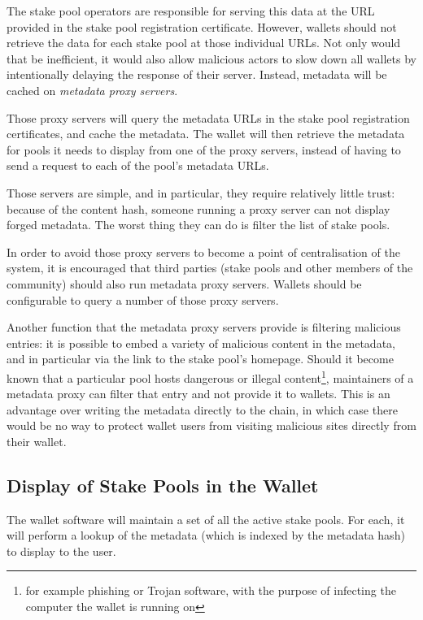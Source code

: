 \documentclass[11pt,a4paper,dvipsnames,twosided]{article}
\begin{document}
The stake pool operators are responsible for serving this data at the URL
provided in the stake pool registration certificate. However, wallets should not
retrieve the data for each stake pool at those individual URLs. Not only would
that be inefficient, it would also allow malicious actors to slow
down all wallets by intentionally delaying the response of their server.
Instead, metadata will be cached on \emph{metadata proxy servers}.

Those proxy servers will query the metadata URLs in the stake pool registration
certificates, and cache the metadata. The wallet will then retrieve the
metadata for pools it needs to display from one of the proxy servers, instead
of having to send a request to each of the pool's metadata URLs.

Those servers are simple, and in particular, they require relatively little
trust: because of the content hash, someone running a proxy server can not
display forged metadata. The worst thing they can do is filter the list of stake
pools.

In order to avoid those proxy servers to become a point of centralisation of the
system, it is encouraged that third parties (stake pools and other members of
the community) should also run metadata proxy servers. Wallets should be
configurable to query a number of those proxy servers.

Another function that the metadata proxy servers provide is filtering malicious
entries: it is possible to embed a variety of malicious content in the metadata,
and in particular via the link to the stake pool's homepage. Should it become
known that a particular pool hosts dangerous or illegal
content\footnote{for example phishing or Trojan software, with the purpose of
  infecting the computer the wallet is running on}, maintainers of
a metadata proxy can filter that entry and not provide it to wallets. This is an
advantage over writing the metadata directly to the chain, in which case there
would be no way to protect wallet users from visiting malicious sites directly
from their wallet.

\subsection{Display of Stake Pools in the Wallet}
\label{display-of-stake-pools-in-the-wallet}

The wallet software will maintain a set of all the active stake pools. For each,
it will perform a lookup of the metadata (which is indexed by the metadata hash)
to display to the user.
\end{document}
